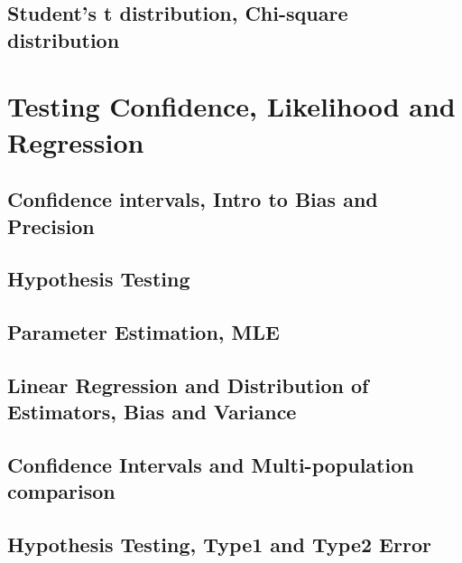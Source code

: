 \documentclass[4pt]{beamer} %
\begin{document}
\subsection{Student's t distribution, Chi-square distribution}
{

}
\section{Testing Confidence, Likelihood and Regression}
\subsection{Confidence intervals, Intro to Bias and Precision}
{

}

\subsection{Hypothesis Testing}
{

}

\subsection{Parameter Estimation, MLE}
{


}

\subsection{Linear Regression and Distribution of Estimators, Bias and Variance}
{




}


\subsection{Confidence Intervals and Multi-population comparison}
{


}


\subsection{Hypothesis Testing, Type1 and Type2 Error}
{


}
\end{document}
